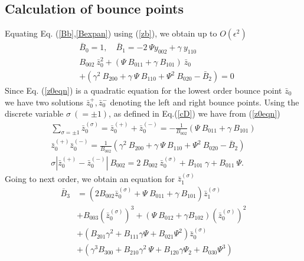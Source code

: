\documentclass[aip,pop,reprint]{revtex4-1}
\newcommand*{\zb}{\bar{z}}
\newcommand*{\zbs}{\zb^{(\sigma)}}
\newcommand*{\zbp}{\zb^{(+)}}
\newcommand*{\zbm}{\zb^{(-)}}
\newcommand*{\Bb}{\bar{B}}
\newcommand*{\lbr}{\left(}
\newcommand*{\rbr}{\right)}
\begin{document}
\subsection{Calculation of bounce points}
Equating Eq. (\ref{Bb},\ref{Bexpan}) using (\ref{zb}), we obtain up to $O(\epsilon^2)$
\begin{subequations}
\begin{align}
&\Bb_0=1, \quad \Bb_1 = -2 \:\Psi y_{002}+\gamma\: y_{110}\\
&B_{002}\:\zb^2_0 + (\Psi\: B_{011}+\gamma\: B_{101})\:\zb_0 \label{z0eqn} \\
 &+(\gamma^2\: B_{200}+ \gamma\:\Psi\: B_{110}+\Psi^2\: B_{020} -\Bb_2)=0 \nonumber
\end{align}
\end{subequations}
Since Eq. (\ref{z0eqn}) is a quadratic equation for the lowest order bounce point $\zb_0$ we have two solutions $\zb_0^{+},\zb_0^{-}$ denoting the left and right bounce points. Using the discrete variable $\sigma\: (=\pm 1)$, as defined in Eq.(\ref{cD}) we have from (\ref{z0eqn})
\begin{subequations}
\begin{align}
\sum_{\sigma=\pm 1} \zbs_0 =\zbp_0 +\zbm_0=-\frac{1}{B_{002}}(\Psi\: B_{011}+\gamma\: B_{101})\label{z0ssum}\\
\zbp_0 \zbm_0=\frac{1}{B_{002}} (\gamma^2\: B_{200}+ \gamma\:\Psi\: B_{110}+\Psi^2\: B_{020} -\Bb_2)\label{z0pz0m}\\
\sigma |\zbp_0-\zbm_0|\:B_{002}= 2\:B_{002}\:\zbs_0 +B_{101}\:\gamma +B_{011}\:\Psi \label{deltaz0}.
\end{align}
\end{subequations}
Going to next order, we obtain an equation for $\zbs_1$
\begin{align}
\Bb_3 &= \lbr 2B_{002}\zbs_0 +\Psi\: B_{011}+\gamma\: B_{101}\rbr \zbs_1\nonumber\\
&+ B_{003}(\zbs_0)^3 + (\Psi\: B_{012}+\gamma B_{102})(\zbs_0)^2\label{z1s}\\ &+(B_{201}\gamma^2+B_{111}\gamma\Psi+B_{021}\Psi^2)\zbs_0 \nonumber\\
&+\lbr \gamma^3 B_{300}+B_{210}\gamma^2\:\Psi +B_{120}\gamma \Psi_2 +B_{030}\Psi^3 \rbr \nonumber
\end{align}
\end{document}

